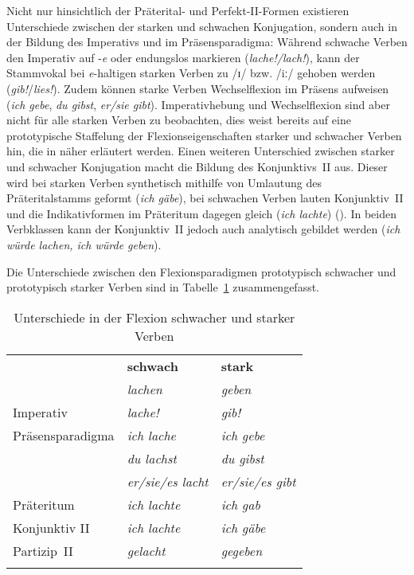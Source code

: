 Nicht nur hinsichtlich der Präterital- und Perfekt-II-Formen existieren Unterschiede zwischen der starken und schwachen Konjugation, sondern auch in der Bildung des Imperativs und im Präsensparadigma: Während schwache Verben den Imperativ auf -\textit{e} oder endungslos markieren (\textit{lache!/lach!}), kann der Stammvokal bei \textit{e}-haltigen starken Verben zu /ɪ/ bzw. /iː/ gehoben werden (\textit{gib!}/\textit{lies!}). Zudem können starke Verben  Wechselflexion im Präsens aufweisen (\textit{ich gebe}, \textit{du gibst}, \textit{er/sie gibt}). Imperativhebung und Wechselflexion sind aber nicht für alle starken Verben zu beobachten, dies weist bereits auf eine prototypische Staffelung der Flexionseigenschaften starker und schwacher Verben hin, die in  näher erläutert werden. Einen weiteren Unterschied zwischen starker und schwacher Konjugation macht die Bildung des Konjunktivs~II aus. Dieser wird bei starken Verben synthetisch mithilfe von Umlautung des Präteritalstamms geformt (\textit{ich gäbe}), bei schwachen Verben lauten Konjunktiv~II und die Indikativformen im Präteritum dagegen gleich (\textit{ich lachte}) (\cite[54--55]{Bittner.1985}). In beiden Verbklassen kann der Konjunktiv~II jedoch auch analytisch gebildet werden (\textit{ich würde lachen, ich würde geben}).

 
Die Unterschiede zwischen den Flexionsparadigmen prototypisch schwacher und prototypisch starker Verben sind in Tabelle~\ref{unterschied} zusammengefasst.

\begin{table}
\caption{Unterschiede in der Flexion schwacher und starker Verben}
\begin{tabular}{lll}
\lsptoprule
&	\textbf{schwach}  & 			\textbf{stark}\\
&						\textit{lachen}	&		\textit{geben}\\\midrule
Imperativ &				\textit{lache!} &		\textit{gib!}\\
Präsensparadigma 	& \textit{ich lache} & \textit{ich gebe} \\
									& \textit{du lachst} &		\textit{du gibst}\\
									& \textit{er/sie/es lacht} & 	\textit{er/sie/es gibt}\\
Präteritum	&	\textit{ich lachte} &			\textit{ich gab} \\
Konjunktiv II	 &		\textit{ich lachte} &		\textit{ich gäbe}\\
Partizip~II		&			\textit{gelacht} &\textit{gegeben} \\
\lspbottomrule
\label{unterschied}
\end{tabular}
\end{table}

